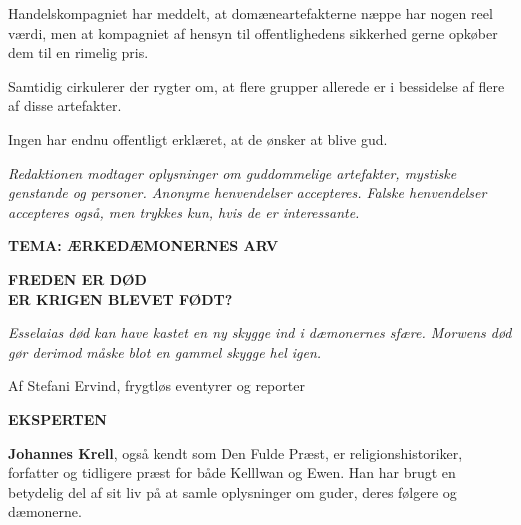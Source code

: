 \documentclass[a4paper,12pt]{memoir}
\newcommand{\kicker}[1]{\textsf{\bfseries\small\color{Gray} #1}}
\newcommand{\headline}[1]{\textsf{\bfseries\fontsize{34}{36}\selectfont #1}}
\newcommand{\deck}[1]{\textsf{\large\itshape #1}}
\newcommand{\byline}[1]{\textsf{\small\color{Gray} Af #1}}
\newcommand{\separator}{%
  \par\noindent{\color{black!40}\rule{\textwidth}{0.4pt}}\par
}
\begin{document}
Handelskompagniet har meddelt, at domæneartefakterne næppe har nogen reel værdi, men at kompagniet af hensyn til offentlighedens sikkerhed gerne opkøber dem til en rimelig pris.

Samtidig cirkulerer der rygter om, at flere grupper allerede er i bessidelse af flere af disse artefakter.

Ingen har endnu offentligt erklæret, at de ønsker at blive gud.

\separator

\par\medskip

\textit{Redaktionen modtager oplysninger om guddommelige artefakter, mystiske genstande og personer. Anonyme henvendelser accepteres. Falske henvendelser accepteres også, men trykkes kun, hvis de er interessante.}

\newpage

\kicker{TEMA: ÆRKEDÆMONERNES ARV}

\par\smallskip

\headline{FREDEN ER DØD\\
ER KRIGEN BLEVET FØDT?}

\par\medskip

\deck{Esselaias død kan have kastet en ny skygge ind i
dæmonernes sfære. Morwens død gør derimod måske blot
en gammel skygge hel igen.}

\par\medskip

\byline{Stefani Ervind, frygtløs eventyrer og reporter}

\medskip

\begin{tcolorbox}[
  enhanced,
  colback=Maroon!4,
  colframe=Maroon!85!black,
  boxrule=1.2pt,
  borderline west={4pt}{0pt}{Maroon!85!black},
  sharp corners,
  left=5mm,
  right=5mm,
  top=3mm,
  bottom=3mm
]
\begin{minipage}{0.22\linewidth}
\centering
{\sffamily\bfseries\Large EKSPERTEN}
\end{minipage}
\hfill
\begin{minipage}{0.73\linewidth}
\small
\textbf{Johannes Krell}, også kendt som Den Fulde Præst,
er religionshistoriker, forfatter og tidligere præst for både
Kelllwan og Ewen. Han har brugt en betydelig del af sit liv
på at samle oplysninger om guder, deres følgere og dæmonerne.
\end{minipage}
\end{tcolorbox}
\end{document}
